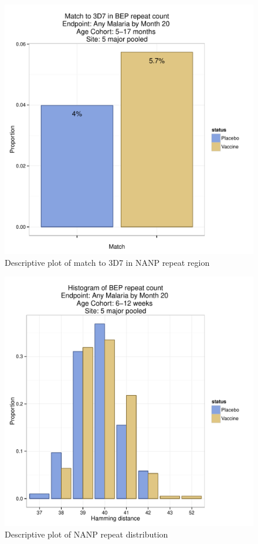 \documentclass[]{article}
\begin{document}
\begin{figure}[htbp]
\centering
\includegraphics{figures/bep-match-infact-x-1.pdf}
\caption{Descriptive plot of match to 3D7 in NANP repeat region}
\end{figure}

\begin{figure}[htbp]
\centering
\includegraphics{figures/bep-hist-newborn-x-1.pdf}
\caption{Descriptive plot of NANP repeat distribution}
\end{figure}
\end{document}
